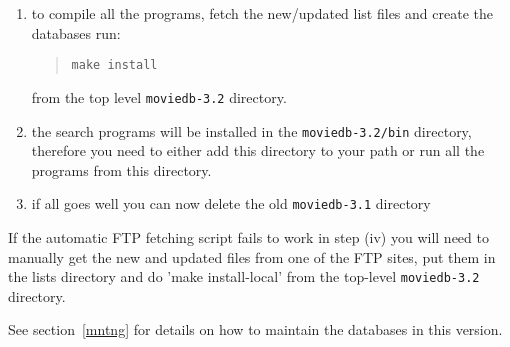 \begin{enumerate}
\begin{enumerate}
\item to compile all the programs, fetch the new/updated list files and create 
       the databases run:
\begin{quote}
{\tt make install}
\end{quote}
       from the top level {\tt moviedb-3.2} directory.
       
\item the search programs will be installed in the {\tt moviedb-3.2/bin} directory,
       therefore you need to either add this directory to your path or run
       all the programs from this directory.
       
\item  if all goes well you can now delete the old {\tt moviedb-3.1} directory

\end{enumerate}

If the automatic FTP fetching script fails to work in step (iv) you will need
to manually get the new and updated files from one of the FTP sites, put
them in the lists directory and do 'make install-local' from the top-level
{\tt moviedb-3.2} directory.

See section~\ref{mntng} for details on how to maintain the databases in this version.
\end{enumerate}                                

